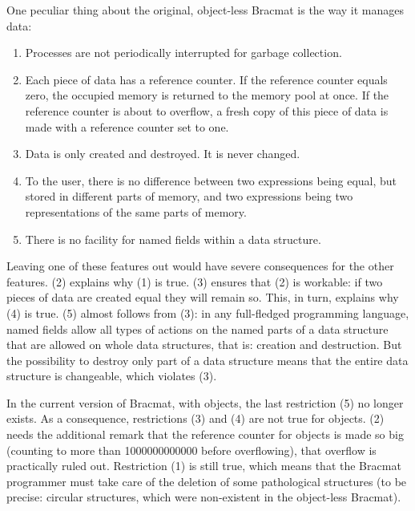\documentclass[12pt]{article}
\begin{document}
One peculiar thing about the original, object-less Bracmat is the way
it manages data:
\begin{enumerate}
\item Processes are not periodically interrupted for garbage
  collection.
\item Each piece of data has a reference counter. If the reference
  counter equals zero, the occupied memory is returned to the memory
  pool at once. If the reference counter is about to overflow, a fresh
  copy of this piece of data is made with a reference counter set to
  one.
\item Data is only created and destroyed. It is never changed.
\item To the user, there is no difference between two expressions
  being equal, but stored in different parts of memory, and two
  expressions being two representations of the same parts of memory.
\item There is no facility for named fields within a data structure.
\end{enumerate}

Leaving one of these features out would have severe consequences for
the other features. (2) explains why (1) is true. (3) ensures that (2)
is workable: if two pieces of data are created equal they will remain
so. This, in turn, explains why (4) is true. (5) almost follows from
(3): in any full-fledged programming language, named fields allow all
types of actions on the named parts of a data structure that are
allowed on whole data structures, that is: creation and
destruction. But the possibility to destroy only part of a data
structure means that the entire data structure is changeable,
which violates (3).

In the current version of Bracmat, with objects, the last restriction
(5) no longer exists. As a consequence, restrictions (3) and (4) are
not true for objects. (2) needs the additional remark that the
reference counter for objects is made so big (counting to more than
1000000000000 before overflowing), that overflow is practically ruled
out. Restriction (1) is still true, which means that the Bracmat
programmer must take care of the deletion of some pathological
structures (to be precise: circular structures, which were
non-existent in the object-less Bracmat).
\end{document}
